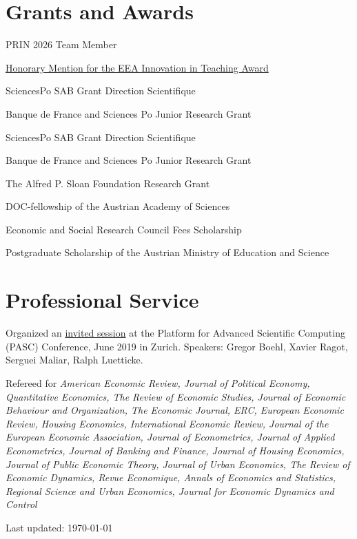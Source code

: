 \documentclass[letterpaper]{article}
\renewenvironment{itemize}{
  \begin{list}{}{
    \setlength{\leftmargin}{1.5em}
  }
}{
  \end{list}
}
\begin{document}
\section*{Grants and Awards}


\begin{itemize}
\item[2026:] PRIN 2026 Team Member
\item[2022:] \href{https://www.eeassoc.org/eea-award-innovation-teaching-2022}{Honorary Mention for the EEA Innovation in Teaching Award}
\item[2022--2024:] SciencesPo SAB Grant Direction Scientifique
\item[2020:] Banque de France and Sciences Po Junior Research Grant
\item[2018:] SciencesPo SAB Grant Direction Scientifique
\item[2016:] Banque de France and Sciences Po Junior Research Grant
\item[2012--2014:] The Alfred P. Sloan Foundation Research Grant
\item[2010--2012:] DOC-fellowship of the Austrian Academy of Sciences
\item[2009--2012:] Economic and Social Research Council Fees Scholarship
\item[2007--2008:] Postgraduate Scholarship of the Austrian Ministry of Education and Science
\end{itemize}

\section*{Professional Service}

\begin{itemize}
\item Organized an \href{https://pasc19.pasc-conference.org/program/schedule/session/?sess=sess124}{invited session} at the Platform for Advanced Scientific Computing (PASC) Conference, June 2019 in Zurich. Speakers: Gregor Boehl, Xavier Ragot, Serguei Maliar, Ralph Luetticke.
\item Refereed for {\it American Economic Review, Journal of Political Economy, Quantitative Economics, The Review of Economic Studies, Journal of Economic Behaviour and Organization, The Economic Journal, ERC, European Economic Review, Housing Economics, International Economic Review, Journal of the European Economic Association, Journal of Econometrics, Journal of Applied Econometrics, Journal of Banking and Finance, Journal of Housing Economics, Journal of Public Economic Theory, Journal of Urban Economics, The Review of Economic Dynamics, Revue Economique, Annals of Economics and Statistics, Regional Science and Urban Economics, Journal for Economic Dynamics and Control}
\end{itemize}

\bigskip

\begin{center}
  \begin{footnotesize}
    Last updated: \today \\
  \end{footnotesize}
\end{center}
\end{document}
